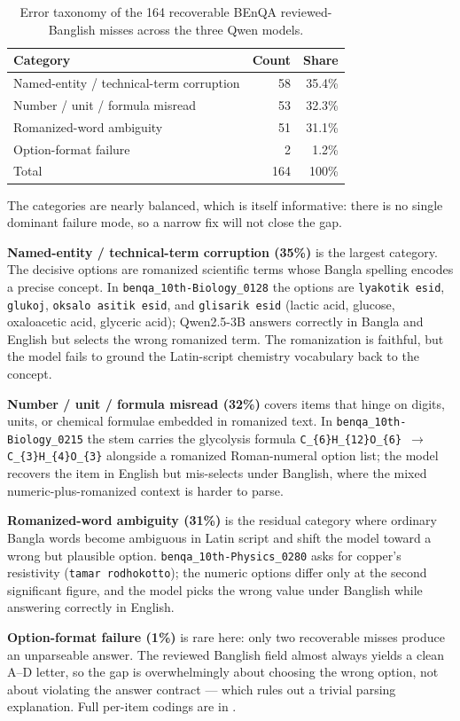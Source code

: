 \begin{table}[H]
\centering
\caption{Error taxonomy of the 164 recoverable BEnQA reviewed-Banglish misses across the three Qwen models.}
\label{tab:error-taxonomy}
\small
\begin{tabular}{lrr}
\hline
Category & Count & Share \\
\hline
Named-entity / technical-term corruption & 58 & 35.4\% \\
Number / unit / formula misread & 53 & 32.3\% \\
Romanized-word ambiguity & 51 & 31.1\% \\
Option-format failure & 2 & 1.2\% \\
\hline
Total & 164 & 100\% \\
\hline
\end{tabular}%
\end{table}

The categories are nearly balanced, which is itself informative: there is no single dominant failure mode, so a narrow fix will not close the gap.

\textbf{Named-entity / technical-term corruption (35\%)} is the largest category. The decisive options are romanized scientific terms whose Bangla spelling encodes a precise concept. In \texttt{benqa\_10th-Biology\_0128} the options are \texttt{lyakotik esid}, \texttt{glukoj}, \texttt{oksalo asitik esid}, and \texttt{glisarik esid} (lactic acid, glucose, oxaloacetic acid, glyceric acid); Qwen2.5-3B answers correctly in Bangla and English but selects the wrong romanized term. The romanization is faithful, but the model fails to ground the Latin-script chemistry vocabulary back to the concept.

\textbf{Number / unit / formula misread (32\%)} covers items that hinge on digits, units, or chemical formulae embedded in romanized text. In \texttt{benqa\_10th-Biology\_0215} the stem carries the glycolysis formula \texttt{C\_\{6\}H\_\{12\}O\_\{6\} $\rightarrow$ C\_\{3\}H\_\{4\}O\_\{3\}} alongside a romanized Roman-numeral option list; the model recovers the item in English but mis-selects under Banglish, where the mixed numeric-plus-romanized context is harder to parse.

\textbf{Romanized-word ambiguity (31\%)} is the residual category where ordinary Bangla words become ambiguous in Latin script and shift the model toward a wrong but plausible option. \texttt{benqa\_10th-Physics\_0280} asks for copper's resistivity (\texttt{tamar rodhokotto}); the numeric options differ only at the second significant figure, and the model picks the wrong value under Banglish while answering correctly in English.

\textbf{Option-format failure (1\%)} is rare here: only two recoverable misses produce an unparseable answer. The reviewed Banglish field almost always yields a clean A--D letter, so the gap is overwhelmingly about choosing the wrong option, not about violating the answer contract --- which rules out a trivial parsing explanation. Full per-item codings are in .

\endinput
